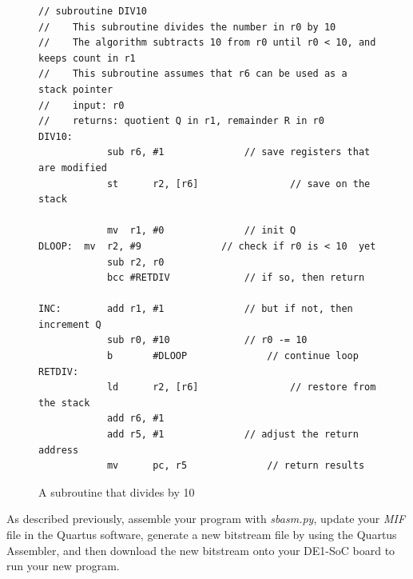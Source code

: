\documentclass[epsfig,10pt,fullpage]{article}
\begin{document}
\lstset{language=ASM,numbers=none,escapechar=|}
\begin{figure}[H]
\begin{center}
\begin{minipage}[h]{15 cm}
\begin{lstlisting}[name=proc]
// subroutine DIV10
//	  This subroutine divides the number in r0 by 10
//	  The algorithm subtracts 10 from r0 until r0 < 10, and keeps count in r1
//	  This subroutine assumes that r6 can be used as a stack pointer
//	  input: r0
//	  returns: quotient Q in r1, remainder R in r0
DIV10:
			sub	r6, #1				// save registers that are modified
			st		r2, [r6]				// save on the stack

			mv 	r1, #0				// init Q
DLOOP:	mv 	r2, #9				// check if r0 is < 10  yet
			sub	r2, r0
			bcc	#RETDIV				// if so, then return

INC:		add	r1, #1				// but if not, then increment Q
			sub	r0, #10				// r0 -= 10
			b 		#DLOOP				// continue loop
RETDIV:
			ld		r2, [r6]				// restore from the stack
			add	r6, #1
			add	r5, #1				// adjust the return address
			mv		pc, r5				// return results
\end{lstlisting}
\end{minipage}
\caption{A subroutine that divides by 10}
\label{fig:div10}
\end{center}
\end{figure}

\noindent
As described previously, assemble your program with {\it sbasm.py}, update your {\it MIF} file 
in the Quartus software, generate a new bitstream file by using the Quartus Assembler, and 
then download the new bitstream onto your DE1-SoC board to run your new program. 
\end{document}
